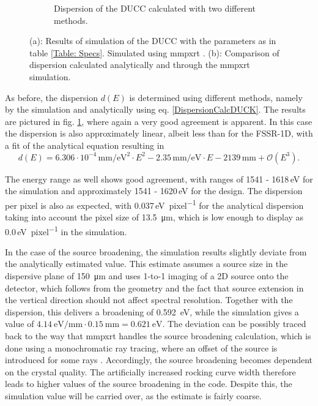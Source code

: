 \begin{figure} [H]
\begin{subfigure}[t]{0.68\textwidth}
		\caption{Dispersion of the DUCC calculated 
		with two different methods.}
		\label{DispComparisonDUCK}
	\end{subfigure}%
	\caption{(a): Results of simulation of 
	the DUCC with the parameters as in 
	table \ref{Table: Specs}. Simulated using 
	mmpxrt \citep{vsmid2021x}. (b): Comparison of 
	dispersion calculated analytically and 
	through the mmpxrt simulation.}
	\label{mmpxrtDUCC}
\end{figure}

As before, the dispersion $d(E)$ is determined using different 
methods, namely 
by the simulation and analytically using eq. 
\ref{DispersionCalcDUCK}. The 
results are pictured in fig. \ref{DispComparisonDUCK}, where 
again a very good 
agreement is apparent. In this case the dispersion is also 
approximately 
linear, albeit less than for the FSSR-1D, with a fit 
of the 
analytical 
equation resulting in 
\begin{equation}
d(E) = 6.306\cdot 
10^{-4}\,\si{\milli\meter\per\electronvolt\squared} \cdot E^2 
-2.35\,\si{\milli\meter\per\electronvolt} \cdot E - 2139 
\,\si{\milli\meter} + \mathcal{O}(E^3).
\end{equation}

The energy range as well shows good agreement, with ranges of 
1541 - 
1618\,\si{\electronvolt} for the simulation and approximately 
1541 - 
1620\,\si{\electronvolt} for the design. The dispersion per 
pixel is also as 
expected, with 0.037\,\si{\electronvolt\per pixel} for the 
analytical 
dispersion taking into account the pixel size of 
\SI{13.5}{\micro\meter}, which 
is low 
enough to display as 0.0\,\si{\electronvolt\per pixel} in the 
simulation.

In the case of the source broadening, the 
simulation results slightly deviate from the 
analytically 
estimated value. This estimate assumes a 
source size in 
the dispersive plane of \SI{150}{\micro\meter} and 
uses 1-to-1 imaging of a 2D source onto the detector, 
which follows from the 
geometry and the fact that source extension in the 
vertical direction should not affect spectral 
resolution. Together with the dispersion, this 
delivers a broadening of \SI{0.592}{eV}, while the 
simulation gives a value of 
$\SI{4.14}{\electronvolt\per\milli\meter}\cdot 
\SI{0.15}{\milli\meter} = \SI{0.621}{\electronvolt}$. 
The deviation can be possibly traced back to 
the way that mmpxrt handles the source broadening 
calculation, which is done using a monochromatic ray 
tracing, where an offset of the source is 
introduced for some rays \citep{vsmid2021x}. 
Accordingly, the source broadening becomes dependent 
on the crystal quality. The artificially increased 
rocking curve width therefore leads to higher values 
of the source broadening in the code. Despite this, 
the simulation value will be carried over, as the 
estimate is fairly coarse.

